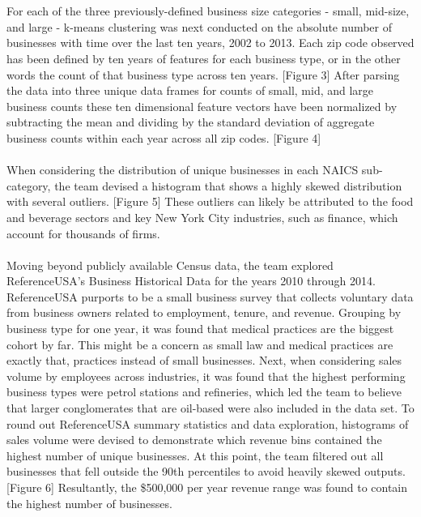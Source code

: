 \documentclass[article, 11pt]{article} %
\begin{document}
\\\\
For each of the three previously-defined business size categories - small, mid-size, and large - k-means clustering was next conducted on the absolute number of businesses with time over the last ten years, 2002 to 2013. Each zip code observed has been defined by ten years of features for each business type, or in the other words the count of that business type across ten years. [Figure 3] After parsing the data into three unique data frames for counts of small, mid, and large business counts these ten dimensional feature vectors have been normalized by subtracting the mean and dividing by the standard deviation of aggregate business counts within each year across all zip codes. [Figure 4]
\\\\
When considering the distribution of unique businesses in each NAICS sub-category, the team devised a histogram that shows a highly skewed distribution with several outliers. [Figure 5] These outliers can likely be attributed to the food and beverage sectors and key New York City industries, such as finance, which account for thousands of firms. 
\\\\
Moving beyond publicly available Census data, the team explored ReferenceUSA's Business Historical Data for the years 2010 through 2014. ReferenceUSA purports to be a small business survey that collects voluntary data from business owners related to employment, tenure, and revenue. Grouping by business type for one year, it was found that medical practices are the biggest cohort by far. This might be a concern as small law and medical practices are exactly that, practices instead of small businesses. Next, when considering sales volume by employees across industries, it was found that the highest performing business types were petrol stations and refineries, which led the team to believe that larger conglomerates that are oil-based were also included in the data set. To round out ReferenceUSA summary statistics and data exploration, histograms of sales volume were devised to demonstrate which revenue bins contained the highest number of unique businesses. At this point, the team filtered out all businesses that fell outside the 90th percentiles to avoid heavily skewed outputs. [Figure 6] Resultantly, the \$500,000 per year revenue range was found to contain the highest number of businesses.

\end{document}
